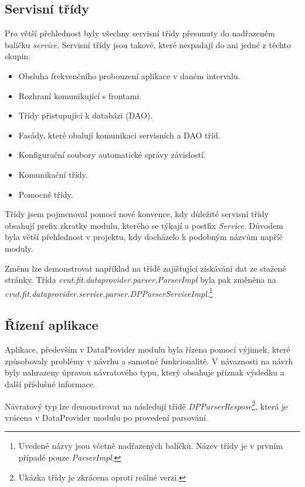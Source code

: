 \documentclass[thesis=B,czech]{FITthesis}[2012/06/26]
\begin{document}
\subsection{Servisní třídy}
Pro větší přehlednost byly všechny servisní třídy přesunuty do nadřazeném balíčku \textit{service}. 
Servisní třídy jsou takové, které nespadají do ani jedné z těchto skupin:

\begin{itemize}
\item Obsluha frekvenčního probouzení aplikace v daném intervalu.
\item Rozhraní komunikující s frontami.
\item Třídy přistupující k databázi (DAO).
\item Fasády, které obalují komunikaci servisních a DAO tříd.
\item Konfigurační soubory automatické správy závislostí.
\item Komunikační třídy.
\item Pomocné třídy.
\end{itemize}

Třídy jsem pojmenoval pomocí nové konvence, kdy důležité servisní třídy obsahují prefix zkratky modulu, kterého se týkají
a postfix \textit{Service}. Důvodem byla větší přehlednost v projektu, kdy docházelo k podobným názvům napříč moduly.
\par
Změnu lze demonstrovat například na třídě zajišťující získávání dat ze stažené stránky. Třída \textit{cvut.fit.dataprovider.parser.ParserImpl} byla pak změněna na \textit{cvut.fit.dataprovider.service.parser.DPParserServiceImpl}.\footnote{Uvedené názvy jsou včetně 
nadřazených balíčků. Název třídy je v prvním případě pouze \textit{ParserImpl}.}

\subsection{Řízení aplikace}
Aplikace, především v DataProvider modulu byla řízena pomocí výjimek, které způsobovaly problémy v návrhu a samotné funkcionalitě.
V návaznosti na návrh byly nahrazeny úpravou návratového typu, který obsahuje příznak výsledku 
a další příslušné informace.
\par
Návratový typ lze demonstrovat na následují třídě \textit{DPParserRespose}\footnote{Ukázka třídy je zkrácena oproti reálné verzi.}, která je vrácena v DataProvider modulu po provedení parsování.
\end{document}
